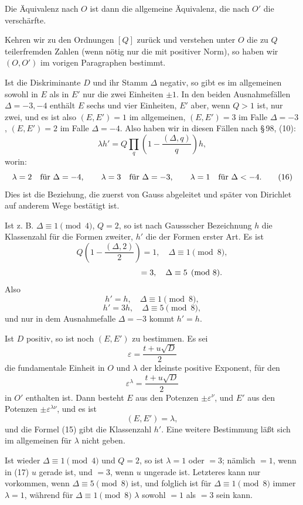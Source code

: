 \documentclass[11pt]{article}
\begin{document}
Die Äquivalenz nach \(O\) ist dann die allgemeine Äquivalenz, die nach \(O'\) die verschärfte.

Kehren wir zu den Ordnungen \([Q]\) zurück und verstehen unter \(O\) die zu \(Q\) teilerfremden Zahlen (wenn nötig nur die mit positiver Norm), so haben wir \((O,O')\) im vorigen Paragraphen bestimmt.

Ist die Diskriminante \(D\) und ihr Stamm \(\Delta\) negativ, so gibt es im allgemeinen sowohl in \(E\) als in \(E'\) nur die zwei Einheiten \(\pm1\). In den beiden Ausnahmefällen \(\Delta=-3,-4\) enthält \(E\) sechs und vier Einheiten, \(E'\) aber, wenn \(Q>1\) ist, nur zwei, und es ist also \((E,E')=1\) im allgemeinen, \((E,E')=3\) im Falle \(\Delta=-3\), \((E,E')=2\) im Falle \(\Delta=-4\). Also haben wir in diesen Fällen nach \S\,98, (10):
\begin{equation}
 \lambda h'=Q\prod_q\left(1-\frac{(\Delta,q)}{q}\right)h,
\tag{15}
\end{equation}
worin:
\begin{equation}
 \lambda=2\quad\hbox{für }\Delta=-4,\qquad
 \lambda=3\quad\hbox{für }\Delta=-3,\qquad
 \lambda=1\quad\hbox{für }\Delta<-4.
\tag{16}
\end{equation}
Dies ist die Beziehung, die zuerst von Gauss abgeleitet und später von Dirichlet auf anderem Wege bestätigt ist.

Ist z. B. \(\Delta\equiv1\pmod4\), \(Q=2\), so ist nach Gaussscher Bezeichnung \(h\) die Klassenzahl für die Formen zweiter, \(h'\) die der Formen erster Art. Es ist
\[
 Q\left(1-\frac{(\Delta,2)}{2}\right)=1,\quad \Delta\equiv1\pmod8,
\]
\[
 \hphantom{Q\left(1-\frac{(\Delta,2)}{2}\right)}=3,\quad \Delta\equiv5\pmod8.
\]
Also
\[
 h'=h,\quad \Delta\equiv1\pmod8,
\]
\[
 h'=3h,\quad \Delta\equiv5\pmod8,
\]
und nur in dem Ausnahmefalle \(\Delta=-3\) kommt \(h'=h\).

Ist \(D\) positiv, so ist noch \((E,E')\) zu bestimmen. Es sei
\[
 \varepsilon=\frac{t+u\sqrt D}{2}
\]
die fundamentale Einheit in \(O\) und \(\lambda\) der kleinste positive Exponent, für den
\[
 \varepsilon^\lambda=\frac{t+u\sqrt D}{2}
\]
in \(O'\) enthalten ist. Dann besteht \(E\) aus den Potenzen \(\pm\varepsilon^\nu\), und \(E'\) aus den Potenzen \(\pm\varepsilon^{\lambda\nu}\), und es ist
\[
 (E,E')=\lambda,
\]
und die Formel (15) gibt die Klassenzahl \(h'\). Eine weitere Bestimmung läßt sich im allgemeinen für \(\lambda\) nicht geben.

Ist wieder \(\Delta\equiv1\pmod4\) und \(Q=2\), so ist \(\lambda=1\) oder \(=3\); nämlich \(=1\), wenn in (17) \(u\) gerade ist, und \(=3\), wenn \(u\) ungerade ist. Letzteres kann nur vorkommen, wenn \(\Delta\equiv5\pmod8\) ist, und folglich ist für \(\Delta\equiv1\pmod8\) immer \(\lambda=1\), während für \(\Delta\equiv1\pmod8\) \(\lambda\) sowohl \(=1\) als \(=3\) sein kann.
\end{document}
